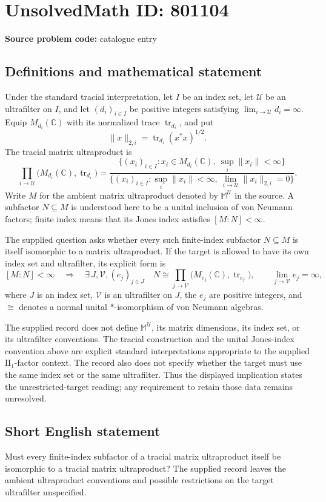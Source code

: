 \documentclass[11pt]{article}
\newcommand{\C}{\mathbb{C}}
\begin{document}
\section*{UnsolvedMath ID: 801104}
\textbf{Source problem code:} catalogue entry
\subsection{Definitions and mathematical statement}
Under the standard tracial interpretation, let \(I\) be an index set, let \(\mathcal U\) be an ultrafilter on \(I\), and let \((d_i)_{i\in I}\) be positive integers satisfying \(\lim_{i\to\mathcal U}d_i=\infty\). Equip \(M_{d_i}(\C)\) with its normalized trace \(\operatorname{tr}_{d_i}\), and put
\[
\|x\|_{2,i}=\operatorname{tr}_{d_i}(x^*x)^{1/2}.
\]
The tracial matrix ultraproduct is
\[
\prod_{i\to\mathcal U}\bigl(M_{d_i}(\C),\operatorname{tr}_{d_i}\bigr)
=
\frac{\{(x_i)_{i\in I}:x_i\in M_{d_i}(\C),\ \sup_i\|x_i\|<\infty\}}
{\{(x_i)_{i\in I}:\sup_i\|x_i\|<\infty,\ \lim_{i\to\mathcal U}\|x_i\|_{2,i}=0\}}.
\]
Write \(M\) for the ambient matrix ultraproduct denoted by \(\mathbb M^{\mathcal U}\) in the source. A subfactor \(N\subseteq M\) is understood here to be a unital inclusion of von Neumann factors; finite index means that its Jones index satisfies \([M:N]<\infty\).

The supplied question asks whether every such finite-index subfactor \(N\subseteq M\) is itself isomorphic to a matrix ultraproduct. If the target is allowed to have its own index set and ultrafilter, its explicit form is
\[
[M:N]<\infty
\quad\Longrightarrow\quad
\exists\,J,\mathcal V,(e_j)_{j\in J}\quad
N\cong\prod_{j\to\mathcal V}
\bigl(M_{e_j}(\C),\operatorname{tr}_{e_j}\bigr),
\qquad \lim_{j\to\mathcal V}e_j=\infty,
\]
where \(J\) is an index set, \(\mathcal V\) is an ultrafilter on \(J\), the \(e_j\) are positive integers, and \(\cong\) denotes a normal unital \(*\)-isomorphism of von Neumann algebras.

The supplied record does not define \(\mathbb M^{\mathcal U}\), its matrix dimensions, its index set, or its ultrafilter conventions. The tracial construction and the unital Jones-index convention above are explicit standard interpretations appropriate to the supplied \(\mathrm{II}_1\)-factor context. The record also does not specify whether the target must use the same index set or the same ultrafilter. Thus the displayed implication states the unrestricted-target reading; any requirement to retain those data remains unresolved.
\subsection{Short English statement}
Must every finite-index subfactor of a tracial matrix ultraproduct itself be isomorphic to a tracial matrix ultraproduct? The supplied record leaves the ambient ultraproduct conventions and possible restrictions on the target ultrafilter unspecified.
\end{document}
